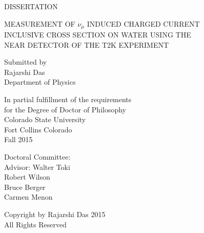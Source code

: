 \thispagestyle{empty}
\begin{center}
DISSERTATION\\

\bigskip
\bigskip
\bigskip
\bigskip
\bigskip

MEASUREMENT OF $\nu_\mu$ INDUCED CHARGED CURRENT\\ 
INCLUSIVE CROSS SECTION ON WATER USING THE\\
NEAR DETECTOR OF THE T2K EXPERIMENT\\

\bigskip
\bigskip
\bigskip
\bigskip
\bigskip

Submitted by\\
Rajarshi Das\\
Department of Physics\\

\bigskip
\bigskip
\bigskip
\bigskip
\bigskip

In partial fulfillment of the requirements\\
for the Degree of Doctor of Philosophy\\
Colorado State University\\
Fort Collins Colorado\\
Fall 2015
\end{center}

\bigskip
\bigskip
\bigskip
\bigskip

\singlespacing
\noindent Doctoral Committee:\\

\indent Advisor: Walter Toki\\

\indent Robert Wilson\\
\indent Bruce Berger\\
\indent Carmen Menon\\


\newpage

\thispagestyle{empty}
\vspace*{\fill}
\doublespacing
\begin{center}
Copyright by Rajarshi Das 2015\\
All Rights Reserved
\end{center}
\vspace*{\fill}

\newpage
{}


